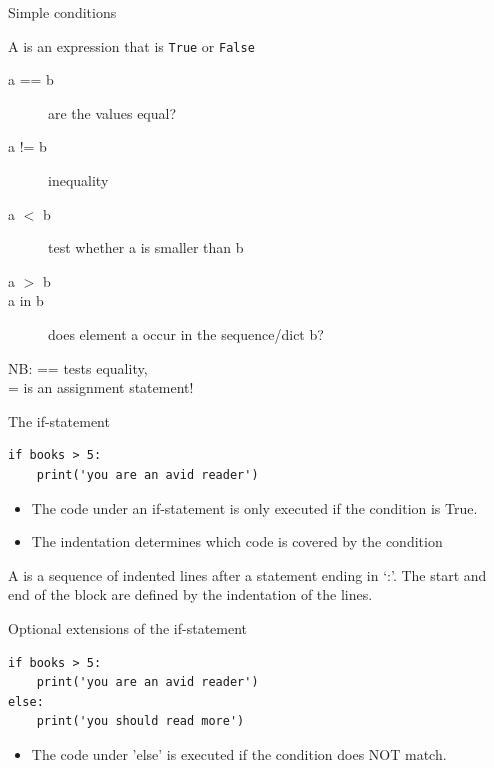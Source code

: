 \documentclass[aspectratio=169,usenames,dvipsnames]{beamer}
\begin{document}
\begin{frame}{Simple conditions}
    \begin{definition}
        A  is
        an expression that is \texttt{True} or \texttt{False}
    \end{definition}
    \begin{description}
        \item[a == b] are the values equal?
        \item[a != b] inequality
        \item[a $<$ b] test whether a is smaller than b
        \item[a $>$ b]
        \item[a in b] does element a occur in the sequence/dict b?
    \end{description}

    NB: == tests equality, \\
        = is an assignment statement!
\end{frame}

\begin{frame}[fragile]{The if-statement}
\begin{lstlisting}
if books > 5:
    print('you are an avid reader')
\end{lstlisting}

    \begin{itemize}
        \item The code under an if-statement is only executed
            if the condition is True.
        \item The indentation determines which code is covered
            by the condition
    \end{itemize}

    \pause
    \begin{definition}
        A  is a sequence of indented lines after
        a statement ending in `:'.
        The start and end of the block are defined by the indentation of the
        lines.
    \end{definition}
\end{frame}


\begin{frame}[fragile]{Optional extensions of the if-statement}
\begin{lstlisting}
if books > 5:
    print('you are an avid reader')
else:
    print('you should read more')
\end{lstlisting}

\begin{itemize}
    \item The code under 'else' is executed if the condition does NOT match.
\end{itemize}
\end{frame}
\end{document}
